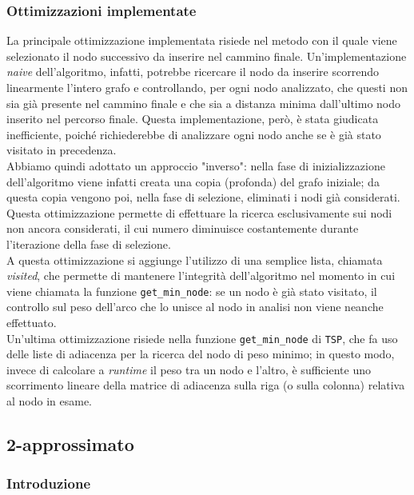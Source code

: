 \subsubsection{Ottimizzazioni implementate}

La principale ottimizzazione implementata risiede nel metodo con il quale viene selezionato il nodo successivo da inserire nel cammino finale. Un'implementazione \textit{naive} dell'algoritmo, infatti, potrebbe ricercare il nodo da inserire scorrendo linearmente l'intero grafo e controllando, per ogni nodo analizzato, che questi non sia già presente nel cammino finale e che sia a distanza minima dall'ultimo nodo inserito nel percorso finale. Questa implementazione, però, è stata giudicata inefficiente, poiché richiederebbe di analizzare ogni nodo anche se è già stato visitato in precedenza. \\
Abbiamo quindi adottato un approccio "inverso": nella fase di inizializzazione dell'algoritmo viene infatti creata una copia (profonda) del grafo iniziale; da questa copia vengono poi, nella fase di selezione, eliminati i nodi già considerati. Questa ottimizzazione permette di effettuare la ricerca esclusivamente sui nodi non ancora considerati, il cui numero diminuisce costantemente durante l'iterazione della fase di selezione. \\
A questa ottimizzazione si aggiunge l'utilizzo di una semplice lista, chiamata \textit{visited}, che permette di mantenere l'integrità dell'algoritmo nel momento in cui viene chiamata la funzione \texttt{get\_min\_node}: se un nodo è già stato visitato, il controllo sul peso dell'arco che lo unisce al nodo in analisi non viene neanche effettuato. \\
Un'ultima ottimizzazione risiede nella funzione \texttt{get\_min\_node} di \texttt{TSP}, che fa uso delle liste di adiacenza per la ricerca del nodo di peso minimo; in questo modo, invece di calcolare a \textit{runtime} il peso tra un nodo e l'altro, è sufficiente uno scorrimento lineare della matrice di adiacenza sulla riga (o sulla colonna) relativa al nodo in esame.

\subsection{2-approssimato}

\subsubsection{Introduzione}


